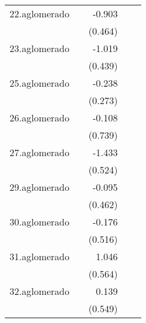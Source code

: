 {\begin{longtable}{l*{4}{D{.}{.}{-1}}}
\addlinespace
22.aglomerado&                     &      -0.903         &                     &                     \\
            &                     &     (0.464)         &                     &                     \\
\addlinespace
23.aglomerado&                     &      -1.019\sym{*}  &                     &                     \\
            &                     &     (0.439)         &                     &                     \\
\addlinespace
25.aglomerado&                     &      -0.238         &                     &                     \\
            &                     &     (0.273)         &                     &                     \\
\addlinespace
26.aglomerado&                     &      -0.108         &                     &                     \\
            &                     &     (0.739)         &                     &                     \\
\addlinespace
27.aglomerado&                     &      -1.433\sym{**} &                     &                     \\
            &                     &     (0.524)         &                     &                     \\
\addlinespace
29.aglomerado&                     &      -0.095         &                     &                     \\
            &                     &     (0.462)         &                     &                     \\
\addlinespace
30.aglomerado&                     &      -0.176         &                     &                     \\
            &                     &     (0.516)         &                     &                     \\
\addlinespace
31.aglomerado&                     &       1.046         &                     &                     \\
            &                     &     (0.564)         &                     &                     \\
\addlinespace
32.aglomerado&                     &       0.139         &                     &                     \\
            &                     &     (0.549)         &                     &                     \\

\end{longtable}}
